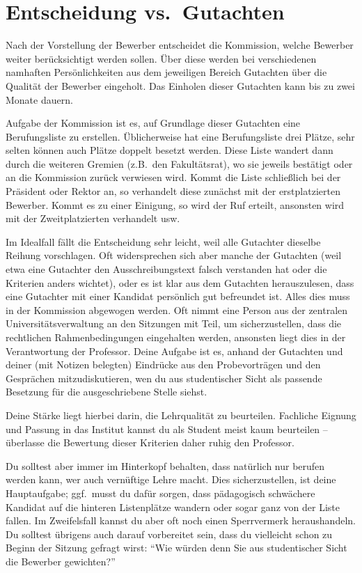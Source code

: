 \section{Entscheidung vs.\ Gutachten}
Nach der Vorstellung der Bewerber entscheidet die Kommission, welche Bewerber weiter berücksichtigt werden sollen. Über diese werden bei verschiedenen namhaften Persönlichkeiten aus dem jeweiligen Bereich Gutachten über die Qualität der Bewerber eingeholt. Das Einholen dieser Gutachten kann bis zu zwei Monate dauern.

Aufgabe der Kommission ist es, auf Grundlage dieser Gutachten eine Berufungsliste zu erstellen. Üblicherweise hat eine Berufungsliste drei Plätze, sehr selten können auch Plätze doppelt besetzt werden. Diese Liste wandert dann durch die weiteren Gremien (z.B.\ den Fakultätsrat), wo sie jeweils bestätigt oder an die Kommission zurück verwiesen wird. Kommt die Liste schließlich bei der Präsident oder Rektor an, so verhandelt diese zunächst mit der erstplatzierten Bewerber. Kommt es zu einer Einigung, so wird der Ruf erteilt, ansonsten wird mit der Zweitplatzierten verhandelt usw.

Im Idealfall fällt die Entscheidung sehr leicht, weil alle Gutachter dieselbe Reihung vorschlagen. Oft widersprechen sich aber manche der Gutachten (weil etwa eine Gutachter den Ausschreibungstext falsch verstanden hat oder die Kriterien anders wichtet), oder es ist klar aus dem Gutachten herauszulesen, dass eine Gutachter mit einer Kandidat persönlich gut befreundet ist. Alles dies muss in der Kommission abgewogen werden. Oft nimmt eine Person aus der zentralen Universitätsverwaltung an den Sitzungen mit Teil, um sicherzustellen, dass die rechtlichen Rahmenbedingungen eingehalten werden, ansonsten liegt dies in der Verantwortung der Professor. Deine Aufgabe ist es, anhand der Gutachten und deiner (mit Notizen belegten) Eindrücke aus den Probevorträgen und den Gesprächen mitzudiskutieren, wen du aus studentischer Sicht als passende Besetzung für die ausgeschriebene Stelle siehst.

Deine Stärke liegt hierbei darin, die Lehrqualität zu beurteilen. Fachliche Eignung und Passung in das Institut kannst du als Student meist kaum beurteilen -- überlasse die Bewertung dieser Kriterien daher ruhig den Professor.

Du solltest aber immer im Hinterkopf behalten, dass natürlich nur berufen werden kann, wer auch vernüftige Lehre macht. Dies sicherzustellen, ist deine Hauptaufgabe; ggf.\ musst du dafür sorgen, dass pädagogisch schwächere Kandidat auf die hinteren Listenplätze wandern oder sogar ganz von der Liste fallen. Im Zweifelsfall kannst du aber oft noch einen Sperrvermerk heraushandeln. Du solltest übrigens auch darauf vorbereitet sein, dass du vielleicht schon zu Beginn der Sitzung gefragt wirst: \enquote{Wie würden denn Sie aus studentischer Sicht die Bewerber gewichten?}


